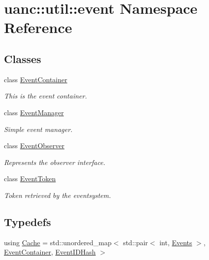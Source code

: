 \hypertarget{namespaceuanc_1_1util_1_1event}{}\section{uanc\+:\+:util\+:\+:event Namespace Reference}
\label{namespaceuanc_1_1util_1_1event}
\subsection*{Classes}
\begin{DoxyCompactItemize}
\item 
class \hyperlink{classuanc_1_1util_1_1event_1_1_event_container}{Event\+Container}
\begin{DoxyCompactList}\small\item\em This is the event container. \end{DoxyCompactList}\item 
class \hyperlink{classuanc_1_1util_1_1event_1_1_event_manager}{Event\+Manager}
\begin{DoxyCompactList}\small\item\em Simple event manager. \end{DoxyCompactList}\item 
class \hyperlink{classuanc_1_1util_1_1event_1_1_event_observer}{Event\+Observer}
\begin{DoxyCompactList}\small\item\em Represents the observer interface. \end{DoxyCompactList}\item 
class \hyperlink{classuanc_1_1util_1_1event_1_1_event_token}{Event\+Token}
\begin{DoxyCompactList}\small\item\em Token retrieved by the eventsystem. \end{DoxyCompactList}\end{DoxyCompactItemize}
\subsection*{Typedefs}
\begin{DoxyCompactItemize}
\item 
using \hyperlink{namespaceuanc_1_1util_1_1event_a6c68db6cd59c1f00cb2103bb9ee263a1}{Cache} = std\+::unordered\+\_\+map$<$ std\+::pair$<$ int, \hyperlink{namespaceuanc_1_1util_1_1event_a63f690675589114db9c6bcbe6f1088a4}{Events} $>$, \hyperlink{classuanc_1_1util_1_1event_1_1_event_container}{Event\+Container}, \hyperlink{struct_event_i_d_hash}{Event\+I\+D\+Hash} $>$
\end{DoxyCompactItemize}
